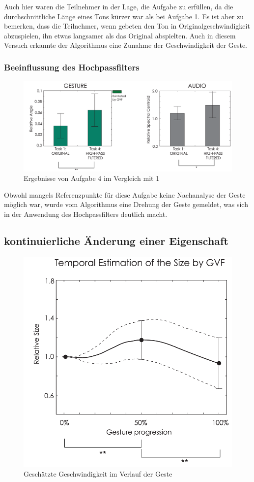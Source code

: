 \documentclass{llncs}
\begin{document}
Auch hier waren die Teilnehmer in der Lage, die Aufgabe zu erfüllen, da die durchschnittliche Länge eines Tons kürzer war als bei Aufgabe 1. Es ist aber zu bemerken, dass die Teilnehmer, wenn gebeten den Ton in Originalgeschwindigkeit abzuspielen, ihn etwas langsamer als das Original abspielten. Auch in diesem Versuch erkannte der Algorithmus eine Zunahme der Geschwindigkeit der Geste.

\subsubsection{Beeinflussung des Hochpassfilters}
\begin{figure}
\centering
\includegraphics[width=0.7\linewidth]{../Bilder/Fig15}
\caption{Ergebnisse von Aufgabe 4 im Vergleich mit 1}
\label{fig:Fig15}
\end{figure}

Obwohl mangels Referenzpunkte für diese Aufgabe keine Nachanalyse der Geste möglich war, wurde vom Algorithmus eine Drehung der Geste gemeldet, was sich in der Anwendung des Hochpassfilters deutlich macht.

\subsection{kontinuierliche Änderung einer Eigenschaft}
\begin{figure}
\centering
\includegraphics[width=0.7\linewidth]{../Bilder/Fig16}
\caption{Geschätzte Geschwindigkeit im Verlauf der Geste}
\label{fig:Fig16}
\end{figure}
\end{document}
